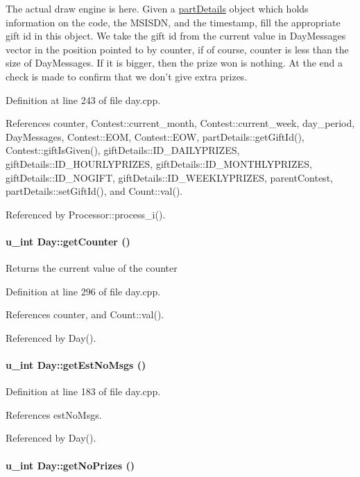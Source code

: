 The actual draw engine is here. Given a \hyperlink{classpartDetails}{part\-Details} object which holds information on the code, the MSISDN, and the timestamp, fill the appropriate gift id in this object. We take the gift id from the current value in Day\-Messages vector in the position pointed to by counter, if of course, counter is less than the size of Day\-Messages. If it is bigger, then the prize won is nothing. At the end a check is made to confirm that we don't give extra prizes. 

Definition at line 243 of file day.cpp.

References counter, Contest::current\_\-month, Contest::current\_\-week, day\_\-period, Day\-Messages, Contest::EOM, Contest::EOW, part\-Details::get\-Gift\-Id(), Contest::gift\-Is\-Given(), gift\-Details::ID\_\-DAILYPRIZES, gift\-Details::ID\_\-HOURLYPRIZES, gift\-Details::ID\_\-MONTHLYPRIZES, gift\-Details::ID\_\-NOGIFT, gift\-Details::ID\_\-WEEKLYPRIZES, parent\-Contest, part\-Details::set\-Gift\-Id(), and Count::val().

Referenced by Processor::process\_\-i().\hypertarget{classDay_Daya10}{
\paragraph[getCounter]{\setlength{\rightskip}{0pt plus 5cm}u\_\-int Day::get\-Counter ()}\hfill}
\label{classDay_Daya10}


Returns the current value of the counter 

Definition at line 296 of file day.cpp.

References counter, and Count::val().

Referenced by Day().\hypertarget{classDay_Daya7}{
\paragraph[getEstNoMsgs]{\setlength{\rightskip}{0pt plus 5cm}u\_\-int Day::get\-Est\-No\-Msgs ()}\hfill}
\label{classDay_Daya7}




Definition at line 183 of file day.cpp.

References est\-No\-Msgs.

Referenced by Day().\hypertarget{classDay_Daya12}{
\paragraph[getNoPrizes]{\setlength{\rightskip}{0pt plus 5cm}u\_\-int Day::get\-No\-Prizes ()}\hfill}
\label{classDay_Daya12}


